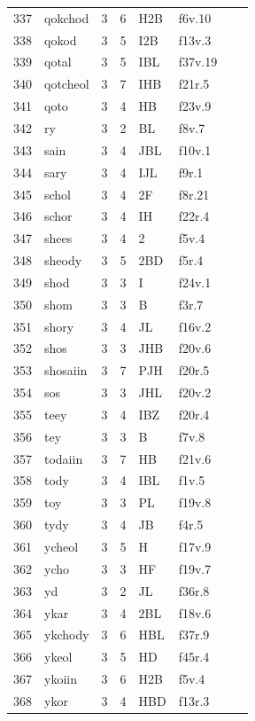 \documentclass[11pt,a4paper]{article}
\begin{document}
\begin{landscape}
\begin{longtable}{@{}r>{\ttfamily}lrrl>{\ttfamily}l>{\raggedright\arraybackslash}p{80mm}>{\raggedright\arraybackslash}p{36mm}@{}}
337 & qokchod & 3 & 6 & H2B & f6v.10 &  & \\
338 & qokod & 3 & 5 & I2B & f13v.3 &  & \\
339 & qotal & 3 & 5 & IBL & f37v.19 &  & \\
340 & qotcheol & 3 & 7 & IHB & f21r.5 &  & \\
341 & qoto & 3 & 4 & HB & f23v.9 &  & \\
342 & ry & 3 & 2 & BL & f8v.7 &  & \\
343 & sain & 3 & 4 & JBL & f10v.1 &  & \\
344 & sary & 3 & 4 & IJL & f9r.1 &  & \\
345 & schol & 3 & 4 & 2F & f8r.21 &  & \\
346 & schor & 3 & 4 & IH & f22r.4 &  & \\
347 & shees & 3 & 4 & 2 & f5v.4 &  & \\
348 & sheody & 3 & 5 & 2BD & f5r.4 &  & \\
349 & shod & 3 & 3 & I & f24v.1 &  & \\
350 & shom & 3 & 3 & B & f3r.7 &  & \\
351 & shory & 3 & 4 & JL & f16v.2 &  & \\
352 & shos & 3 & 3 & JHB & f20v.6 &  & \\
353 & shosaiin & 3 & 7 & PJH & f20r.5 &  & \\
354 & sos & 3 & 3 & JHL & f20v.2 &  & \\
355 & teey & 3 & 4 & IBZ & f20r.4 &  & \\
356 & tey & 3 & 3 & B & f7v.8 &  & \\
357 & todaiin & 3 & 7 & HB & f21v.6 &  & \\
358 & tody & 3 & 4 & IBL & f1v.5 &  & \\
359 & toy & 3 & 3 & PL & f19v.8 &  & \\
360 & tydy & 3 & 4 & JB & f4r.5 &  & \\
361 & ycheol & 3 & 5 & H & f17v.9 &  & \\
362 & ycho & 3 & 3 & HF & f19v.7 &  & \\
363 & yd & 3 & 2 & JL & f36r.8 &  & \\
364 & ykar & 3 & 4 & 2BL & f18v.6 &  & \\
365 & ykchody & 3 & 6 & HBL & f37r.9 &  & \\
366 & ykeol & 3 & 5 & HD & f45r.4 &  & \\
367 & ykoiin & 3 & 6 & H2B & f5v.4 &  & \\
368 & ykor & 3 & 4 & HBD & f13r.3 &  & \\

\end{longtable}
\end{landscape}
\end{document}
